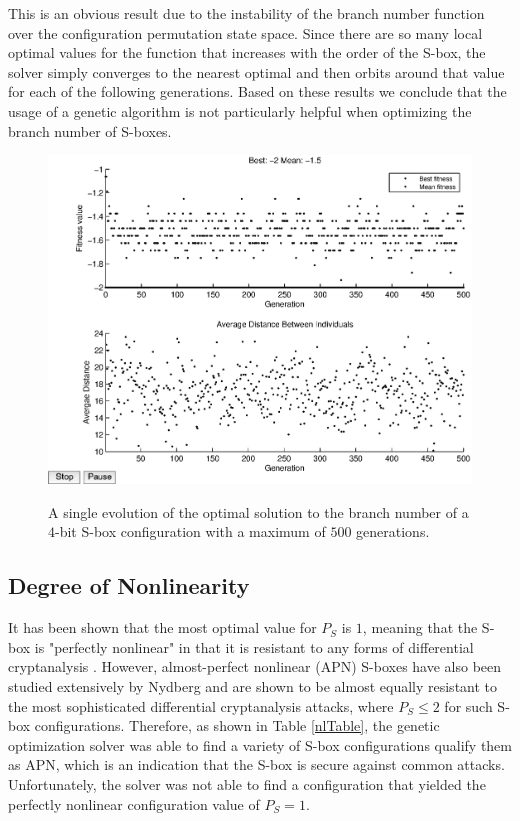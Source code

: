 \documentclass[11pt]{article}
\begin{document}
This is an obvious result due to the instability of the branch number function over the configuration permutation state space. Since there are so many local optimal values for the function that increases with the order of the S-box, the solver simply converges to the nearest optimal and then orbits around that value for each of the following generations. Based on these results we conclude that the usage of a genetic algorithm is not particularly helpful when optimizing the branch number of S-boxes.

\begin{figure}[!ht]
	\centering
	\includegraphics[scale=0.5]{images/bn_results16.eps} \\
	\label{bn16}
\caption{A single evolution of the optimal solution to the branch number of a $4$-bit S-box configuration with a maximum of $500$ generations.}
\end{figure}

\subsection{Degree of Nonlinearity}
It has been shown that the most optimal value for $P_S$ is $1$, meaning that the S-box is "perfectly nonlinear" in that it is resistant to any forms of differential cryptanalysis \cite{ProvableSecurity}. However, almost-perfect nonlinear (APN) S-boxes have also been studied extensively by Nydberg and are shown to be almost equally resistant to the most sophisticated differential cryptanalysis attacks, where $P_S \leq 2$ for such S-box configurations. Therefore, as shown in Table \ref{nlTable}, the genetic optimization solver was able to find a variety of S-box configurations qualify them as APN, which is an indication that the S-box is secure against common attacks. Unfortunately, the solver was not able to find a configuration that yielded the perfectly nonlinear configuration value of $P_S = 1$. 
\end{document}
